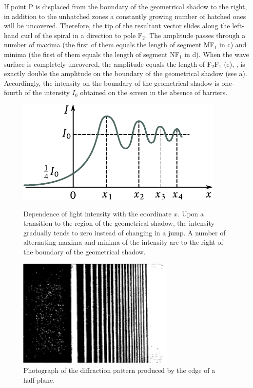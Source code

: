 If point P is displaced from the boundary of the geometrical shadow to the right, in addition to the unhatched zones a constantly growing number of hatched ones will be uncovered.
Therefore, the tip of the resultant vector slides along the left-hand curl of the spiral in a direction to pole F$_2$.
The amplitude passes through a number of maxima (the first of them equals the length of segment MF$_1$ in c) and minima (the first of them equals the length of segment NF$_1$ in d).
When the wave surface is completely uncovered, the amplitude equals the length of F$_2$F$_1$ (e), \ie, is exactly double the amplitude on the boundary of the geometrical shadow (see a).
Accordingly, the intensity on the boundary of the geometrical shadow is one-fourth of the intensity $I_0$ obtained on the screen in the absence of barriers.

\begin{figure}[!htb]
	\begin{minipage}[t]{0.54\linewidth}
		\begin{center}
			\includegraphics[scale=0.95]{figures/ch_18/fig_18_21.pdf}
            \caption[]{Dependence of light intensity with the coordinate $x$. Upon a transition to the region of the geometrical shadow, the intensity gradually tends to zero instead of changing in a jump. A number of alternating maxima and minima of the intensity are to the right of the boundary of the geometrical shadow.}
			\label{fig:18_21}
		\end{center}
	\end{minipage}
	\hfill{ }%
	\begin{minipage}[t]{0.42\linewidth}
		\begin{center}
			\includegraphics[scale=0.95]{figures/ch_18/fig_18_22.pdf}
			\caption[]{Photograph of the diffraction pattern produced by the edge of a half-plane.}
			\label{fig:18_22}
		\end{center}
	\end{minipage}
\vspace{-0.4cm}
\end{figure}

